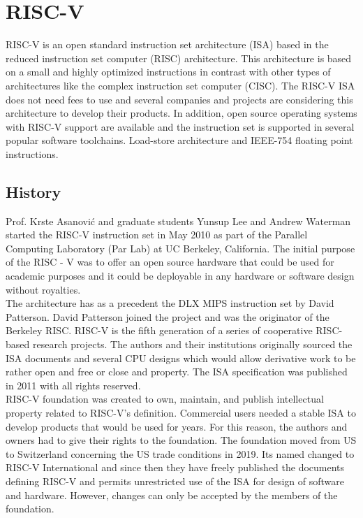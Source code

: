 \section{RISC-V}

RISC-V is an open standard instruction set architecture (\gls{ISA}) based in the reduced instruction set computer (\gls{RISC}) architecture. This architecture is based on a small and highly optimized instructions in contrast with other types of architectures like the complex instruction set computer (\gls{CISC}). The RISC-V \gls{ISA} does not need fees to use and several companies and projects  are considering this architecture to develop their products. In addition, open source operating systems with RISC-V support are available and the instruction set is supported in several popular software toolchains. Load-store architecture and IEEE-754 floating point instructions. \\

\subsection{History}

Prof. Krste Asanović and graduate students Yunsup Lee and Andrew Waterman started the RISC-V instruction set in May 2010 \cite{riscvh} as part of the Parallel Computing Laboratory (Par Lab) at UC Berkeley, California. The initial purpose of the RISC - V was to offer an open source hardware that could be used for academic purposes and it could be deployable in any hardware or software design without royalties.\\

The architecture has as a precedent the DLX MIPS instruction set by David Patterson. David Patterson joined the project and was the originator of the Berkeley RISC. RISC-V is the fifth generation of a series of cooperative RISC-based research projects. The authors and their institutions originally sourced the ISA documents and several CPU designs which would allow derivative work to be rather open and free or close and property. The \gls{ISA} specification was published in 2011  with all rights reserved. \\

RISC-V foundation was created to own, maintain, and publish intellectual property related to RISC-V's definition. Commercial users needed a stable \gls{ISA} to develop products that would be used for years. For this reason, the authors and owners had to give their rights to the foundation. The foundation moved from US to Switzerland concerning the US trade conditions in 2019. Its named changed to RISC-V International and since then they have freely published the documents defining RISC-V and permits unrestricted use of the \gls{ISA} for design of software and hardware. However, changes can only be accepted by the members of the foundation. \\

